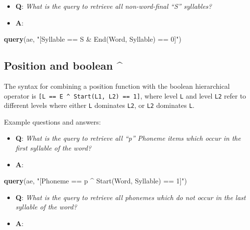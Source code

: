\documentclass[]{book}
\newenvironment{Shaded}{\begin{snugshade}}{\end{snugshade}}
\newcommand{\KeywordTok}[1]{\textcolor[rgb]{0.13,0.29,0.53}{\textbf{#1}}}
\newcommand{\NormalTok}[1]{#1}
\newcommand{\StringTok}[1]{\textcolor[rgb]{0.31,0.60,0.02}{#1}}
\providecommand{\tightlist}{%
  \setlength{\itemsep}{0pt}\setlength{\parskip}{0pt}}
\theoremstyle{definition}
\theoremstyle{definition}
\theoremstyle{definition}
\theoremstyle{remark}
\begin{document}
\begin{itemize}
\tightlist
\item
  \textbf{Q}: \emph{What is the query to retrieve all non-word-final
  ``S'' syllables?}
\item
  \textbf{A}:
\end{itemize}

\begin{Shaded}
\begin{Highlighting}[]
\KeywordTok{query}\NormalTok{(ae, }\StringTok{"[Syllable == S & End(Word, Syllable) == 0]"}\NormalTok{)}
\end{Highlighting}
\end{Shaded}

\hypertarget{position-and-boolean-1}{%
\subsection{Position and boolean \^{}}\label{position-and-boolean-1}}

The syntax for combining a position function with the boolean
hierarchical operator is
\texttt{{[}L\ ==\ E\ \^{}\ Start(L1,\ L2)\ ==\ 1{]}}, where level
\texttt{L} and level \texttt{L2} refer to different levels where either
\texttt{L} dominates \texttt{L2}, or \texttt{L2} dominates \texttt{L}.

Example questions and answers:

\begin{itemize}
\tightlist
\item
  \textbf{Q}: \emph{What is the query to retrieve all ``p'' Phoneme
  items which occur in the first syllable of the word?}
\item
  \textbf{A}:
\end{itemize}

\begin{Shaded}
\begin{Highlighting}[]
\KeywordTok{query}\NormalTok{(ae, }\StringTok{"[Phoneme == p ^ Start(Word, Syllable) == 1]"}\NormalTok{)}
\end{Highlighting}
\end{Shaded}

\begin{itemize}
\tightlist
\item
  \textbf{Q}: \emph{What is the query to retrieve all phonemes which do
  not occur in the last syllable of the word?}
\item
  \textbf{A}:
\end{itemize}
\end{document}
